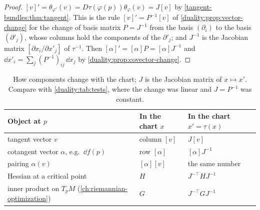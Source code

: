 \begin{notechapter}
\begin{proof}
$[v]' = \theta_{\varphi'}(v) = D\tau(\varphi(p))\theta_\varphi(v) = J[v]$
by \cref{tangent-bundles:thm:tangent}. This is the rule
$[v]' = P^{-1}[v]$ of \cref{duality:prop:vector-change} for the change of
basis matrix $P = J^{-1}$ from the basis $(\partial_i)$ to the basis
$(\partial'_j)$, whose columns hold the components of the $\partial'_j$;
and $J^{-1}$ is the Jacobian matrix $[\partial x_i/\partial x'_j]$ of
$\tau^{-1}$. Then $[\alpha]' = [\alpha]P = [\alpha]J^{-1}$ and
$\dd x'_i = \sum_j(P^{-1})_{ij}\,\dd x_j$ by
\cref{duality:prop:covector-change}.
\end{proof}

\begin{table}[ht]
\centering
\small
\begin{tabular}{@{}lll@{}}
\toprule
Object at $p$ & In the chart $x$ & In the chart $x' = \tau(x)$ \\
\midrule
tangent vector $v$ & column $[v]$ & $J[v]$ \\
cotangent vector $\alpha$, e.g.\ $\dd f(p)$ & row $[\alpha]$
  & $[\alpha]J^{-1}$ \\
pairing $\alpha(v)$ & $[\alpha][v]$ & the same number \\
Hessian at a critical point & $H$ & $J^{-\top}HJ^{-1}$ \\
inner product on $T_pM$ (\cref{ch:riemannian-optimization}) & $G$
  & $J^{-\top}GJ^{-1}$ \\
\bottomrule
\end{tabular}
\caption{How components change with the chart; $J$ is the Jacobian matrix
of $x\mapsto x'$. Compare with \cref{duality:tab:tests}, where the change
was linear and $J = P^{-1}$ was constant.}
\label{tangent-bundles:tab:change}
\end{table}


\end{notechapter}
